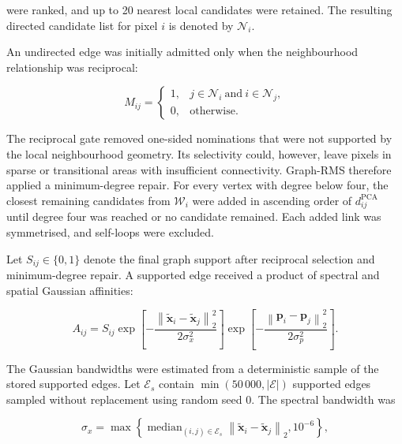 \documentclass[10pt,a4paper,fleqn]{article}
\begin{document}
were ranked, and up to 20 nearest local candidates were retained. The resulting
directed candidate list for pixel \(i\) is denoted by \(\mathcal{N}_i\).

An undirected edge was initially admitted only when the neighbourhood
relationship was reciprocal:

\begin{equation}
M_{ij}
=
\begin{cases}
1,
&
j\in\mathcal{N}_i
\ \text{and}\
i\in\mathcal{N}_j,
\\[3pt]
0,
&
\text{otherwise}.
\end{cases}
\label{eq:mutual_neighbour_gate}
\end{equation}

The reciprocal gate removed one-sided nominations that were not supported by
the local neighbourhood geometry. Its selectivity could, however, leave
pixels in sparse or transitional areas with insufficient connectivity.
Graph-RMS therefore applied a minimum-degree repair. For every vertex with
degree below four, the closest remaining candidates from
\(\mathcal{W}_i\) were added in ascending order of
\(d^{\mathrm{PCA}}_{ij}\) until degree four was reached or no candidate
remained. Each added link was symmetrised, and self-loops were excluded.

Let \(S_{ij}\in\{0,1\}\) denote the final graph support after reciprocal
selection and minimum-degree repair. A supported edge received a product of
spectral and spatial Gaussian affinities:

\begin{equation}
A_{ij}
=
S_{ij}
\exp
\left[
-\frac{
\left\|
\widetilde{\mathbf{x}}_i-
\widetilde{\mathbf{x}}_j
\right\|_2^2
}{
2\sigma_x^2
}
\right]
\exp
\left[
-\frac{
\left\|
\mathbf{p}_i-\mathbf{p}_j
\right\|_2^2
}{
2\sigma_p^2
}
\right].
\label{eq:spectral_spatial_affinity}
\end{equation}

The Gaussian bandwidths were estimated from a deterministic sample of the
stored supported edges. Let \(\mathcal{E}_{s}\) contain
\(\min(50\,000,|\mathcal{E}|)\) supported edges sampled without replacement
using random seed 0. The spectral bandwidth was

\begin{equation}
\sigma_x
=
\max
\left\{
\operatorname{median}_{(i,j)\in\mathcal{E}_{s}}
\left\|
\widetilde{\mathbf{x}}_i-
\widetilde{\mathbf{x}}_j
\right\|_2,
10^{-6}
\right\},
\label{eq:spectral_bandwidth}
\end{equation}
\end{document}
